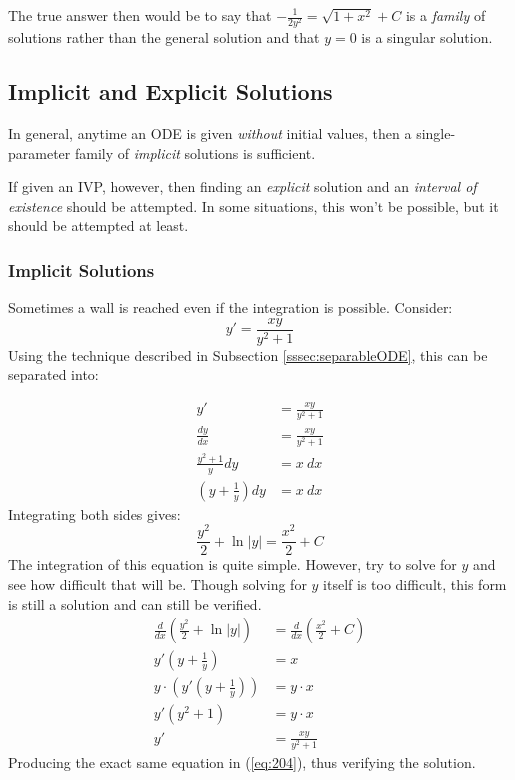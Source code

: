 \documentclass[12pt]{article}
\begin{document}
The true answer then would be to say that $-\frac{1}{2y^2} = \sqrt{1+x^2} + C$ is a \textit{family} of solutions rather than the general solution and that $y=0$ is a singular solution.

\subsection{Implicit and Explicit Solutions}
\label{ssec:implicitAndExplicitSolutions}

In general, anytime an ODE is given \textit{without} initial values, then a single-parameter family of \textit{implicit} solutions is sufficient.

If given an IVP, however, then finding an \textit{explicit} solution and an \textit{interval of existence} should be attempted. In some situations, this won't be possible, but it should be attempted at least.

\subsubsection{Implicit Solutions}
\label{sssec:implicitSolution}

Sometimes a wall is reached even if the integration is possible. Consider:
\begin{equation}
  y' = \frac{xy}{y^2 + 1}
  \label{eq:204}
\end{equation}
Using the technique described in Subsection \ref{sssec:separableODE}, this can be separated into:

\begin{align*}
  y' &= \frac{xy}{y^2 + 1} \\
  \frac{dy}{dx} &= \frac{xy}{y^2 + 1} \\
  \frac{y^2 + 1}{y}dy  &= x\ dx \\
  \left(y+\frac{1}{y}\right)dy  &= x\ dx
\end{align*}
Integrating both sides gives:
\begin{equation*}
  \frac{y^2}{2} + \ln|y| = \frac{x^2}{2} + C
\end{equation*}
The integration of this equation is quite simple. However, try to solve for $y$ and see how difficult that will be. Though solving for $y$ itself is too difficult, this form is still a solution and can still be verified.
\begin{align*}
  \frac{d}{dx}\left(\frac{y^2}{2} + \ln|y|\right) &= \frac{d}{dx}\left(\frac{x^2}{2} + C\right) \\
  y'\left(y + \frac{1}{y}\right) &= x \\
  y \cdot \left(y'\left(y + \frac{1}{y}\right) \right) &= y \cdot x \\
  y'\left(y^2 + 1\right) &= y \cdot x \\
  y' &= \frac{xy}{y^2 + 1}
\end{align*}
Producing the exact same equation in (\ref{eq:204}), thus verifying the solution.
\end{document}
